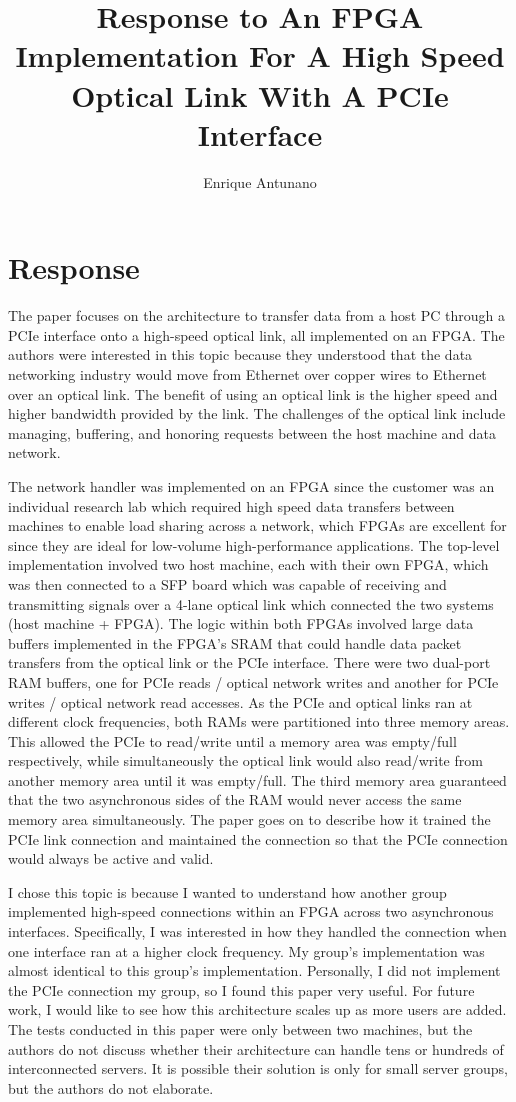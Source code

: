 \documentclass{article}
\title{Response to An FPGA Implementation For A High Speed Optical Link With A PCIe Interface}
\author{Enrique Antunano}
\begin{document}
\maketitle

\section{Response}
The paper focuses on the architecture to transfer data from a host PC through a PCIe interface onto a high-speed optical link, all implemented on an FPGA. The authors were interested in this topic because they understood that the data networking industry would move from Ethernet over copper wires to Ethernet over an optical link. The benefit of using an optical link is the higher speed and higher bandwidth provided by the link. The challenges of the optical link include managing, buffering, and honoring requests between the host machine and data network. 

The network handler was implemented on an FPGA since the customer was an individual research lab which required high speed data transfers between machines to enable load sharing across a network, which FPGAs are excellent for since they are ideal for low-volume high-performance applications. The top-level implementation involved two host machine, each with their own FPGA, which was then connected to a SFP board which was capable of receiving and transmitting signals over a 4-lane optical link which connected the two systems (host machine + FPGA). The logic within both FPGAs involved large data buffers implemented in the FPGA's SRAM that could handle data packet transfers from the optical link or the PCIe interface. There were two dual-port RAM buffers, one for PCIe reads / optical network writes and another for PCIe writes / optical network read accesses. As the PCIe and optical links ran at different clock frequencies, both RAMs were partitioned into three memory areas. This allowed the PCIe to read/write until a memory area was empty/full respectively, while simultaneously the optical link would also read/write from another memory area until it was empty/full. The third memory area guaranteed that the two asynchronous sides of the RAM would never access the same memory area simultaneously. The paper goes on to describe how it trained the PCIe link connection and maintained the connection so that the PCIe connection would always be active and valid. 

I chose this topic is because I wanted to understand how another group implemented  high-speed connections within an FPGA across two asynchronous interfaces. Specifically, I was interested in how they handled the connection when one interface ran at a higher clock frequency. My group's implementation was almost identical to this group's implementation. Personally, I did not implement the PCIe connection my group, so I found this paper very useful. For future work, I would like to see how this architecture scales up as more users are added. The tests conducted in this paper were only between two machines, but the authors do not discuss whether their architecture can handle tens or hundreds of interconnected servers. It is possible their solution is only for small server groups, but the authors do not elaborate.

\nocite{*}



\end{document}
